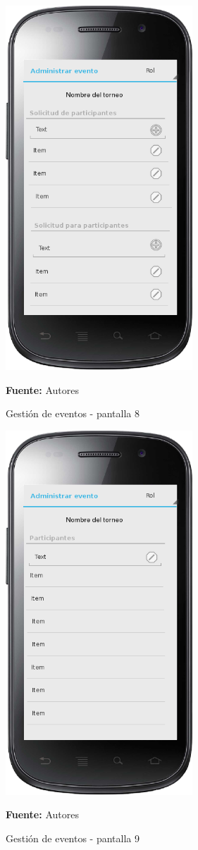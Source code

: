 \begin{figure}[!htb]
  \begin{center}
    \includegraphics[width=7cm]{./imagenes/UI/Eventos/gestion_eventos_8.png}
    \caption{Gestión de eventos - pantalla 8}
    \label{fig:gestion_eventos_8}
    \textbf{Fuente:}  Autores
  \end{center}
\end{figure}

\begin{figure}[!htb]
  \begin{center}
    \includegraphics[width=7cm]{./imagenes/UI/Eventos/gestion_eventos_9.png}
    \caption{Gestión de eventos - pantalla 9}
    \label{fig:gestion_eventos_9}
    \textbf{Fuente:}  Autores
  \end{center}
\end{figure}

